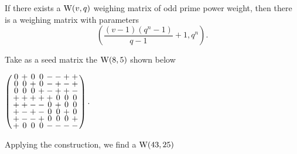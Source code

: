 \documentclass[../../../main]{subfiles}
\begin{document}
\begin{thm}
 If there exists a $\text{W}(v,q)$ weighing matrix of odd prime power weight, then there is a weighing matrix with parameters
 \begin{equation}
  \left(
  \frac{(v-1)(q^n-1)}{q-1} + 1, q^n
  \right).
 \end{equation}
\end{thm}

\begin{ex}
 Take as a seed matrix the $\text{W}(8,5)$ shown below
 \begin{defenum}
  \item $
  \arraycolsep=1.25pt\def\arraystretch{0.625}
  \left(\begin{array}{cccccccc}
0&+&0&0&-&-&+&+\\
0&0&+&0&-&+&-&+\\
0&0&0&+&-&+&+&-\\
+&+&+&+&+&0&0&0\\
+&+&-&-&0&+&0&0\\
+&-&+&-&0&0&+&0\\
+&-&-&+&0&0&0&+\\
+&0&0&0&-&-&-&-\\
  \end{array}\right).
  $
 \end{defenum}
 Applying the construction, we find a $\text{W}(43,25)$
 \begin{defenum}[resume]
  \item {}
\end{defenum}
\end{ex}
\end{document}

